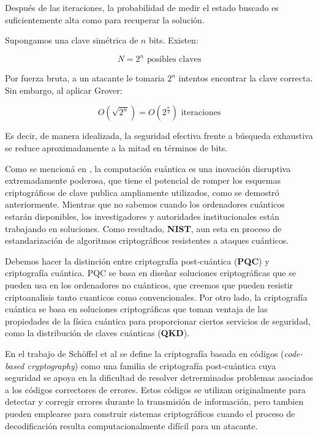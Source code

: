             Después de las iteraciones, la probabilidad de medir el estado buscado es suficientemente alta como para recuperar la solución. 

            Supongamos una clave simétrica de $n$ bits. Existen:

            \begin{equation}
                N = 2^n \text{ posibles claves}
            \end{equation}

            Por fuerza bruta, a un atacante le tomaria $2^{n}$ intentos encontrar la clave correcta. Sin embargo, al aplicar Grover:

            \begin{equation}
                O(\sqrt{2^n}) = O(2^{\frac{n}{2}}) \text{ iteraciones}
            \end{equation}

            Es decir, de manera idealizada, la seguridad efectiva frente a búsqueda exhaustiva se reduce aproximadamente a la mitad en términos de bits. 
            
            Como se mencioná en \cite{european_union_agency_for_cybersecurity_post-quantum_2021}, la computación cuántica es una inovación disruptiva extremadamente poderosa, 
            que tiene el potencial de romper los esquemas criptográficos de clave publica ampliamente utilizados, como se demostró anteriormente. Mientras que no sabemos cuando 
            los ordenadores cuánticos estarán disponibles, los investigadores y autoridades institucionales están trabajando en soluciones. Como resultado, \textbf{NIST}, aun esta en proceso de estandarización de algoritmos criptográficos resistentes a ataques cuánticos.

            Debemos hacer la distinción entre criptografía post-cuántica (\textbf{PQC}) y criptografía cuántica. PQC se basa en diseñar soluciones criptográficas que se pueden usa en los
            ordenadores no cuánticos, que creemos que pueden resistir criptoanalisis tanto cuanticos como convencionales. Por otro lado, la criptografía cuántica se basa en soluciones
            criptográficas que toman ventaja de las propiedades de la física cuántica para proporcionar ciertos servicios de seguridad, como la distribución de claves cuánticas (\textbf{QKD}).
            
            En el trabajo de Schöffel et al \cite{schoffel_code-based_2022} se define la criptografía basada en códigos (\textit{code-based cryptography}) como una familia de criptografía post-cuántica
            cuya seguridad se apoya en la dificultad de resolver detrerminados problemas asociados a los códigos correctores de errores. Estos códigos se utilizan originalmente para detectar y corregir 
            errores durante la transmisión de información, pero tambien pueden emplearse para construir sistemas criptográficos cuando el proceso de decodificación resulta computacionalmente difícil 
            para un atacante. 

